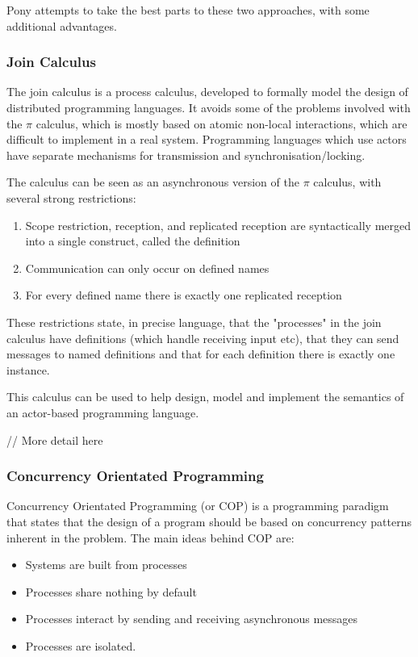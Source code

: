 \documentclass{article}
\begin{document}
Pony attempts to take the best parts to these two approaches, with some
additional advantages.

\subsubsection{Join Calculus}

The join calculus is a process calculus, developed to formally model the design of
distributed programming languages\cite{fournet1996}. It avoids some of the problems
involved with the $\pi$ calculus\cite{milner1989}, which is mostly based on atomic
non-local interactions, which are difficult to implement in a real system. Programming
languages which use actors have separate mechanisms for transmission and
synchronisation/locking.

The calculus can be seen as an asynchronous version of the $\pi$ calculus, with
several strong restrictions:
\begin{enumerate}
	\item Scope restriction, reception, and replicated reception are syntactically 
		 merged into a single construct, called the definition
	\item Communication can only occur on defined names
	\item For every defined name there is exactly one replicated reception
\end{enumerate}

These restrictions state, in precise language, that the "processes" in the join calculus
have definitions (which handle receiving input etc), that they can send messages to named definitions
and that for each definition there is exactly one instance.

This calculus can be used to help design, model and implement the semantics of an
actor-based programming language.

// More detail here

\subsubsection{Concurrency Orientated Programming}
Concurrency Orientated Programming\cite{armstrong2007} (or COP) is a programming
paradigm that states that the design of a program should be based on concurrency
patterns inherent in the problem. The main ideas behind COP are:
\begin{itemize}
\item Systems are built from processes
\item Processes share nothing by default
\item Processes interact by sending and receiving asynchronous messages
\item Processes are isolated.
\end{itemize}
\end{document}
